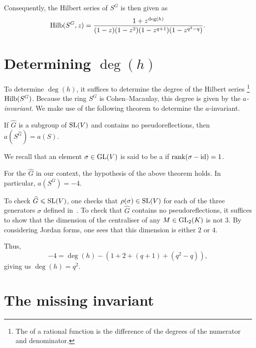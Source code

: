 \documentclass[12pt]{article}
\begin{document}
	Consequently, the Hilbert series of $S^{G}$ is then given as
	\begin{equation*} 
		\operatorname{Hilb}(S^{G}, z) = 
		\frac{1 + z^{\deg(h)}}
		{(1 - z)(1 - z^{2})(1 - z^{q + 1})(1 - z^{q^{2} - q})}.
	\end{equation*}

\section{Determining \texorpdfstring{$\deg(h)$}{deg(h)}}
	
	To determine $\deg(h)$, it suffices to determine the degree of the Hilbert series%
	\footnote{The  of a rational function is the difference of the degrees of the numerator and denominator.} 
	$\operatorname{Hilb}(S^{G})$. 
	Because the ring $S^{G}$ is Cohen--Macaulay, this degree is given by the \emph{$a$-invariant}. 
	We make use of the following theorem to determine the $a$-invariant.

	\begin{thm}
		If $\widehat{G}$ is a subgroup of $\operatorname{SL}(V)$ and contains no pseudoreflections, then $a(S^{\widehat{G}}) = a(S)$.
	\end{thm}
	We recall that an element $\sigma \in \operatorname{GL}(V)$ is said to be a  if $\operatorname{rank}(\sigma - \operatorname{id}) = 1$.

	\begin{prop}
		For the $\widehat{G}$ in our context, the hypothesis of the above theorem holds. 
		In particular, $a(S^{G}) = -4$.
	\end{prop}
	\begin{sketch} 
		To check $\widehat{G} \leqslant \operatorname{SL}(V)$, one checks that $\rho(\sigma) \in \operatorname{SL}(V)$ for each of the three generators $\sigma$ defined in~. 
		To check that $\widehat{G}$ contains no pseudoreflections, it suffices to show that the dimension of the centraliser of any $M \in \operatorname{GL}_{2}(K)$ is not $3$. 
		By considering Jordan forms, one sees that this dimension is either $2$ or $4$.
	\end{sketch}

	Thus,
	\begin{equation*} 
		-4 = \deg(h) - (1 + 2 + (q+1) + (q^{2} - q)),
	\end{equation*}
	giving us $\deg(h) = q^{2}$.

\section{The missing invariant}
	
\end{document}
